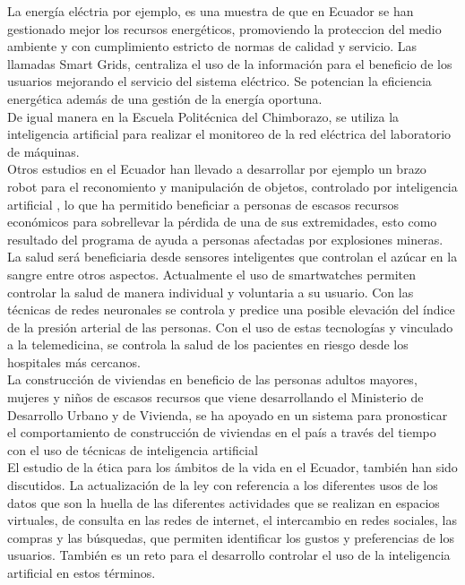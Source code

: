 \documentclass[preprint,12pt,3p]{elsarticle}
\begin{document}
La energía eléctria por ejemplo, es una muestra de que en Ecuador se han gestionado mejor los recursos energéticos, promoviendo la proteccion del medio ambiente y con cumplimiento estricto de normas de calidad y servicio. Las llamadas Smart Grids, centraliza el uso de la información para el beneficio de los usuarios mejorando el servicio del sistema eléctrico. Se potencian la eficiencia energética además de una gestión de la energía oportuna.\cite{alava2016aplicacion} \\

De igual manera en la Escuela Politécnica del Chimborazo, se utiliza la inteligencia artificial para realizar el monitoreo de la red eléctrica del laboratorio de máquinas. \cite{coronel2017monitoreo}\\

Otros estudios en el Ecuador han llevado a desarrollar por ejemplo un brazo robot para el reconomiento y manipulación de objetos, controlado por inteligencia artificial \cite{de2014brazo}, lo que ha permitido beneficiar a personas de escasos recursos económicos para sobrellevar la pérdida de una de sus extremidades, esto como resultado del programa de ayuda a personas afectadas por explosiones mineras.\\

La salud será beneficiaria desde sensores inteligentes que controlan el azúcar en la sangre entre otros aspectos. Actualmente el uso de smartwatches permiten controlar la salud de manera individual y voluntaria a su usuario. Con las técnicas de redes neuronales se controla y predice una posible elevación del índice de la presión arterial de las personas. Con el uso de estas tecnologías y vinculado a la telemedicina, se controla la salud de los pacientes en riesgo desde los hospitales más cercanos. \cite{ledo2019inteligencia}\\

La construcción de viviendas en beneficio de las personas adultos mayores, mujeres y niños de escasos recursos que viene desarrollando el Ministerio de Desarrollo Urbano y de Vivienda, se ha apoyado en un sistema para pronosticar el comportamiento de construcción de viviendas en el país a través del tiempo con el uso de técnicas de inteligencia artificial \cite{delgado2007sistema}\\

El estudio de la ética para los ámbitos de la vida en el Ecuador, también han sido discutidos. La actualización de la ley con referencia a los diferentes usos de los datos que son la huella de las diferentes actividades que se realizan en espacios virtuales, de consulta en las redes de internet, el intercambio en redes sociales, las compras y las búsquedas, que permiten identificar los gustos y preferencias de los usuarios. También es un reto para el desarrollo controlar el uso de la inteligencia artificial en estos términos. \cite{rodriguez2019modelo}\\
\end{document}
